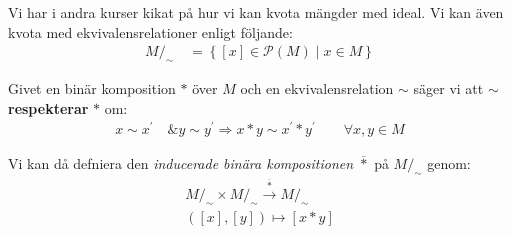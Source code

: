 \par\bigskip
\noindent Vi har i andra kurser kikat på hur vi kan kvota mängder med ideal. Vi kan även kvota med ekvivalensrelationer enligt följande:
\begin{equation*}
  \begin{gathered}
    M/_\sim\quad = \left\{[x]\in\mathcal{P}(M)\;|\; x\in M\right\}
  \end{gathered}
\end{equation*}
\par\bigskip
\noindent Givet en binär komposition $*$ över $M$ och en ekvivalensrelation $\sim$ säger vi att $\sim$ \textbf{respekterar} $*$ om:
\begin{equation*}
  \begin{gathered}
    x\sim x^{\prime}\quad\& y\sim y^{\prime} \Rightarrow x*y\sim x^{\prime}*y^{\prime}\qquad\forall x,y\in M
  \end{gathered}
\end{equation*}
\par\bigskip
\noindent Vi kan då defniera den \textit{inducerade binära kompositionen} $\overline{*}$ på $M/_\sim$ genom:
\begin{equation*}
  \begin{gathered}
    M/_\sim\times M/_\sim\stackrel{\overline{*}}{\to} M/_\sim\\
    \left([x],[y]\right)\mapsto [x*y]
  \end{gathered}
\end{equation*}
\par\bigskip
